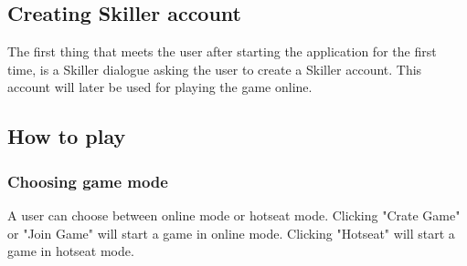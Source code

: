 \subsection{Creating Skiller account}
The first thing that meets the user after starting the application for the first time, is a Skiller dialogue asking the user to create a Skiller account. This account will later be used for playing the game online.

\subsection{How to play}
\label{section:playing}

\subsubsection{Choosing game mode}
A user can choose between online mode or hotseat mode. Clicking "Crate Game" or "Join Game" will start a game in online mode. Clicking "Hotseat" will start a game in hotseat mode.
\label{section:game_mode}
